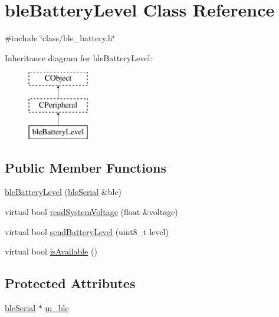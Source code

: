 \hypertarget{classble_battery_level}{\section{ble\-Battery\-Level Class Reference}
\label{classble_battery_level}
}


{\ttfamily \#include \char`\"{}class/ble\-\_\-battery.\-h\char`\"{}}

Inheritance diagram for ble\-Battery\-Level\-:\begin{figure}[H]
\begin{center}
\leavevmode
\includegraphics[height=3.000000cm]{d8/d3b/classble_battery_level}
\end{center}
\end{figure}
\subsection*{Public Member Functions}
\begin{DoxyCompactItemize}
\item 
\hyperlink{classble_battery_level_a212d349975b73b6f6020ce496ed68834}{ble\-Battery\-Level} (\hyperlink{classble_serial}{ble\-Serial} \&ble)
\item 
virtual bool \hyperlink{classble_battery_level_a2c6fae51a8653f720eb50169b094f7a5}{read\-System\-Voltage} (float \&voltage)
\item 
virtual bool \hyperlink{classble_battery_level_ad770083f87f2f193b897ca767593e716}{send\-Battery\-Level} (uint8\-\_\-t level)
\item 
virtual bool \hyperlink{classble_battery_level_a8cfd4674c5b405183b6b282e663849e4}{is\-Available} ()
\end{DoxyCompactItemize}
\subsection*{Protected Attributes}
\begin{DoxyCompactItemize}
\item 
\hyperlink{classble_serial}{ble\-Serial} $\ast$ \hyperlink{classble_battery_level_ac1466f5cc1995a2af27914beb432dedb}{m\-\_\-ble}
\end{DoxyCompactItemize}


